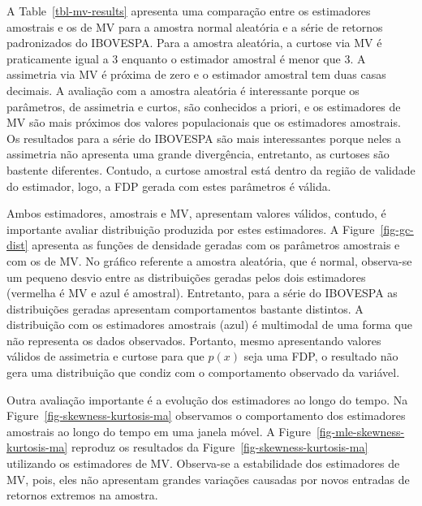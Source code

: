 \documentclass[
  letterpaper,
  DIV=11,
  numbers=noendperiod]{scrartcl}
\begin{document}
A Table~\ref{tbl-mv-results} apresenta uma comparação entre os
estimadores amostrais e os de MV para a amostra normal aleatória e a
série de retornos padronizados do IBOVESPA. Para a amostra aleatória, a
curtose via MV é praticamente igual a 3 enquanto o estimador amostral é
menor que 3. A assimetria via MV é próxima de zero e o estimador
amostral tem duas casas decimais. A avaliação com a amostra aleatória é
interessante porque os parâmetros, de assimetria e curtos, são
conhecidos a priori, e os estimadores de MV são mais próximos dos
valores populacionais que os estimadores amostrais. Os resultados para a
série do IBOVESPA são mais interessantes porque neles a assimetria não
apresenta uma grande divergência, entretanto, as curtoses são bastente
diferentes. Contudo, a curtose amostral está dentro da região de
validade do estimador, logo, a FDP gerada com estes parâmetros é válida.

Ambos estimadores, amostrais e MV, apresentam valores válidos, contudo,
é importante avaliar distribuição produzida por estes estimadores. A
Figure~\ref{fig-gc-dist} apresenta as funções de densidade geradas com
os parâmetros amostrais e com os de MV. No gráfico referente a amostra
aleatória, que é normal, observa-se um pequeno desvio entre as
distribuições geradas pelos dois estimadores (vermelha é MV e azul é
amostral). Entretanto, para a série do IBOVESPA as distribuições geradas
apresentam comportamentos bastante distintos. A distribuição com os
estimadores amostrais (azul) é multimodal de uma forma que não
representa os dados observados. Portanto, mesmo apresentando valores
válidos de assimetria e curtose para que \(p(x)\) seja uma FDP, o
resultado não gera uma distribuição que condiz com o comportamento
observado da variável.

Outra avaliação importante é a evolução dos estimadores ao longo do
tempo. Na Figure~\ref{fig-skewness-kurtosis-ma} observamos o
comportamento dos estimadores amostrais ao longo do tempo em uma janela
móvel. A Figure~\ref{fig-mle-skewness-kurtosis-ma} reproduz os
resultados da Figure~\ref{fig-skewness-kurtosis-ma} utilizando os
estimadores de MV. Observa-se a estabilidade dos estimadores de MV,
pois, eles não apresentam grandes variações causadas por novos entradas
de retornos extremos na amostra.
\end{document}
